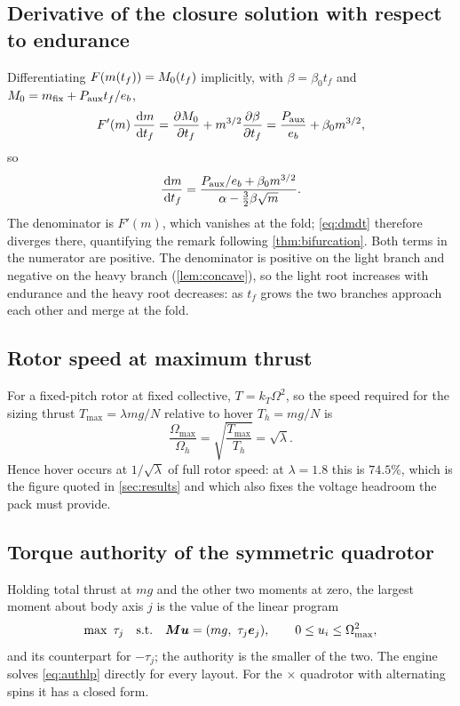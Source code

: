 \subsection{Derivative of the closure solution with respect to endurance}

Differentiating $F(m(t_f))=M_0(t_f)$ implicitly, with
$\beta = \beta_0 t_f$ and $M_0 = m_{\mathrm{fix}} + P_{\mathrm{aux}} t_f/e_b$,
\begin{equation}
  F'(m)\,\frac{\,\mathrm{d} m}{\,\mathrm{d} t_f}
  = \frac{\partial M_0}{\partial t_f} + m^{3/2}\frac{\partial\beta}{\partial t_f}
  = \frac{P_{\mathrm{aux}}}{e_b} + \beta_0 m^{3/2} ,
\end{equation}
so
\begin{equation}
  \frac{\,\mathrm{d} m}{\,\mathrm{d} t_f}
  = \frac{P_{\mathrm{aux}}/e_b + \beta_0 m^{3/2}}{\alpha - \tfrac32\beta\sqrt m} .
  \label{eq:dmdt}
\end{equation}
The denominator is $F'(m)$, which vanishes at the fold; \cref{eq:dmdt} therefore
diverges there, quantifying the remark following \cref{thm:bifurcation}. Both
terms in the numerator are positive. The denominator is positive on the light
branch and negative on the heavy branch (\cref{lem:concave}), so the light root
increases with endurance and the heavy root decreases: as $t_f$ grows the two
branches approach each other and merge at the fold.

\subsection{Rotor speed at maximum thrust}

For a fixed-pitch rotor at fixed collective, $T=k_T\Omega^2$, so the speed
required for the sizing thrust $T_{\max}=\lambda mg/N$ relative to hover
$T_h = mg/N$ is
\begin{equation}
  \frac{\Omega_{\max}}{\Omega_h} = \sqrt{\frac{T_{\max}}{T_h}} = \sqrt{\lambda} .
  \label{eq:omegaratio}
\end{equation}
Hence hover occurs at $1/\sqrt\lambda$ of full rotor speed: at $\lambda=1.8$
this is $74.5\%$, which is the figure quoted in \cref{sec:results} and which
also fixes the voltage headroom the pack must provide.

\subsection{Torque authority of the symmetric quadrotor}

Holding total thrust at $mg$ and the other two moments at zero, the largest
moment about body axis $j$ is the value of the linear program
\begin{equation}
  \max\ \tau_j
  \quad\text{s.t.}\quad
  \mat M\vect u = (mg,\ \tau_j\vect e_j),
  \qquad
  0\le u_i\le\Omega_{\max}^2 ,
  \label{eq:authlp}
\end{equation}
and its counterpart for $-\tau_j$; the authority is the smaller of the two.
The engine solves \cref{eq:authlp} directly for every layout. For the $\times$
quadrotor with alternating spins it has a closed form.

